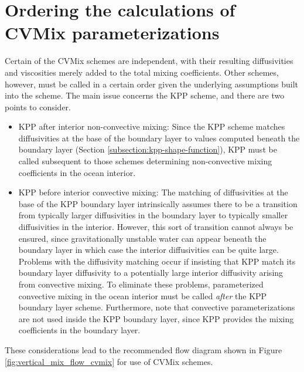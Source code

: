 \section{Ordering the calculations of CVMix parameterizations}
\label{section:vert_mix_schemes_ordering_cvmix}

Certain of the CVMix schemes are independent, with their resulting
diffusivities and viscosities merely added to the total mixing
coefficients.  Other schemes, however, must be called in a certain
order given the underlying assumptions built into the scheme.  The
main issue concerns the KPP scheme, and there are two points to
consider. 
\begin{itemize}
\item {\sc KPP after interior non-convective mixing}: Since the KPP
  scheme matches diffusivities at the base of the boundary layer to
  values computed beneath the boundary layer (Section
  \ref{subsection:kpp-shape-function}), KPP must be called subsequent
  to those schemes determining non-convective mixing coefficients in
  the ocean interior.

\item {\sc KPP before interior convective mixing}: The matching of
  diffusivities at the base of the KPP boundary layer intrinsically
  assumes there to be a transition from typically larger diffusivities
  in the boundary layer to typically smaller diffusivities in the
  interior.  However, this sort of transition cannot always be
  ensured, since gravitationally unstable water can appear beneath the
  boundary layer in which case the interior diffusivities can be quite
  large.  Problems with the diffusivity matching occur if insisting
  that KPP match its boundary layer diffusivity to a potentially large
  interior diffusivity arising from convective mixing.  To eliminate
  these problems, parameterized convective mixing in the ocean
  interior must be called {\it after} the KPP boundary layer scheme.
  Furthermore, note that convective parameterizations are not used
  inside the KPP boundary layer, since KPP provides the mixing
  coefficients in the boundary layer.

\end{itemize}
These considerations lead to the recommended flow diagram shown in
Figure \ref{fig:vertical_mix_flow_cvmix} for use of CVMix schemes.

